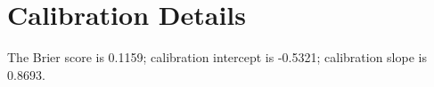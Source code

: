 \section{Calibration Details}
The Brier score is 0.1159; calibration intercept is -0.5321; calibration slope is 0.8693.

